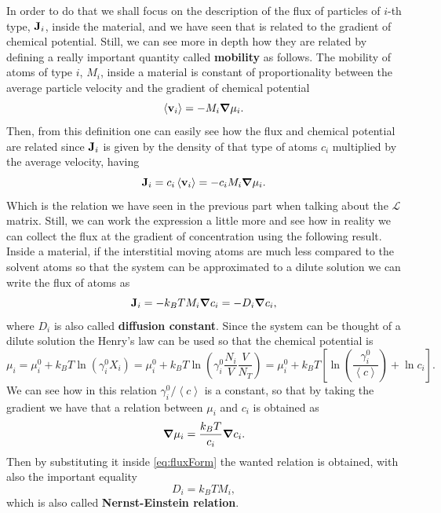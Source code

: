 In order to do that we shall focus on the description of the flux of particles of $i$-th type, $\vb{J}_i$, inside the material, and we have seen that is related to the gradient of chemical potential. Still, we can see more in depth how they are related by defining a really important quantity called \textbf{mobility} as follows.
{
    The mobility of atoms of type $i$, $M_i$, inside a material is constant of proportionality between the average particle velocity and the gradient of chemical potential
    \begin{equation}
        \left\langle \vb{v}_i \right\rangle = -M_i\grad \mu_i.
    \end{equation}
}
\noindent
Then, from this definition one can easily see how the flux and chemical potential are related since $\vb{J}_i$ is given by the density of that type of atoms $c_i$ multiplied by the average velocity, having
\begin{equation}
    \label{eq:fluxForm}
    \vb{J}_i = c_i \left\langle \vb{v}_i \right\rangle = -c_iM_i\grad \mu_i.
\end{equation}
Which is the relation we have seen in the previous part when talking about the $\mathcal{L}$ matrix. Still, we can work the expression a little more and see how in reality we can collect the flux at the gradient of concentration using the following result.
{
    Inside a material, if the interstitial moving atoms are much less compared to the solvent atoms so that the system can be approximated to a dilute solution we can write the flux of atoms as
    \begin{equation}
        \vb{J}_i = -k_B TM_i\grad c_i = -D_i\grad c_i,
    \end{equation}
    where $D_i$ is also called \textbf{diffusion constant}.
}
{
    Since the system can be thought of a dilute solution the Henry’s law can be used so that the chemical potential is
    \begin{equation}
        \mu_i = \mu_i^0 + k_BT\ln\left( \gamma_i^0X_i \right) = \mu_i^0 + k_BT\ln\left( \gamma_i^0\frac{N_i}{V}\frac{V}{N_T} \right) = \mu_i^0 + k_BT\left[ \ln\left( \frac{\gamma_i^0}{\left\langle c \right\rangle} \right) + \ln c_i\right].
    \end{equation}
    We can see how in this relation $\gamma_i^0/\left\langle c \right\rangle$ is a constant, so that by taking the gradient we have that a relation between $\mu_i$ and $c_i$ is obtained as
    \begin{equation}
        \grad \mu_i = \frac{k_BT}{c_i}\grad c_i.
    \end{equation}
    Then by substituting it inside \eqref{eq:fluxForm} the wanted relation is obtained, with also the important equality
    \begin{equation}
        D_i = k_BTM_i,
    \end{equation}
    which is also called \textbf{Nernst-Einstein relation}.
}


